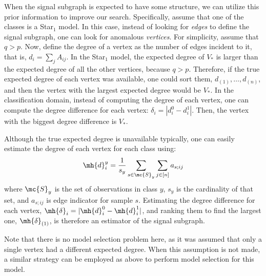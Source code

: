 When the signal subgraph is expected to have some structure, we can utilize this prior information to improve our search.  Specifically, assume that one of the classes is a Star$_1$ model.  In this case, instead of looking for \emph{edges} to define the signal subgraph, one can look for anomalous \emph{vertices}.  For simplicity, assume that $q>p$.  Now, define the degree of a vertex as the number of edges incident to it, that is, $d_i=\sum_j A_{ij}$.  In the Star$_1$ model, the expected degree of $V_*$ is larger than the expected degree of all the other vertices, because $q>p$.  Therefore, if the true expected degree of each vertex was available, one could sort them, $d_{(1)}, \ldots, d_{(n)}$, and then the vertex with the largest expected degree would be $V_*$.  In the classification domain, instead of computing the degree of each vertex, one can compute the degree difference for each vertex: $\delta_i = |d_i^0-d_i^1|$.  Then, the vertex with the biggest degree difference is $V_*$.

Although the true expected degree is unavailable typically, one can easily estimate the degree of each vertex for each class using:
\begin{align}
	\mh{d}_i^y= \frac{1}{s_y}\sum_{s \in \mc{S}_y} \sum_{j\in [n]} a_{s;ij}
\end{align}
where $\mc{S}_y$ is the set of observations in class $y$, $s_y$ is the cardinality of that set, and $a_{s;ij}$ is edge indicator for sample $s$.  Estimating the degree difference for each vertex, $\mh{\delta}_i = |\mh{d}_i^0-\mh{d}_i^1|$, and ranking them to find the largest one, $\mh{\delta}_{(1)}$, is therefore an estimator of the signal subgraph.

Note that there is no model selection problem here, as it was assumed that only a single vertex had a different expected degree.  When this assumption is not made, a similar strategy can be employed as above to perform model selection for this model.


